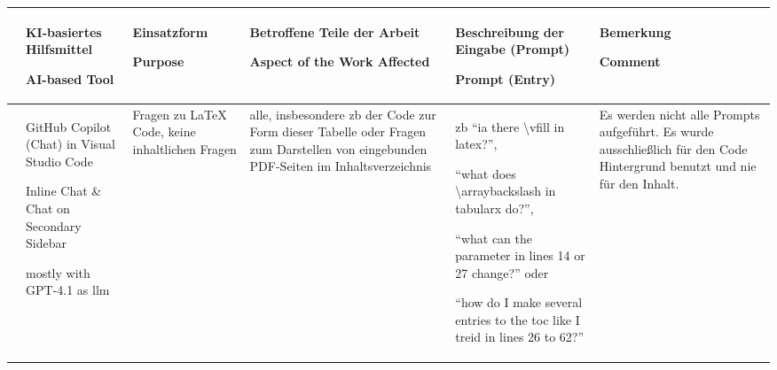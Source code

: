         \begin{landscape}
    \begin{table}
\centering 
\begin{tabularx}{\linewidth}{| >{\raggedright\arraybackslash} c || >{\raggedright\arraybackslash} X | >{\raggedright\arraybackslash} X | >{\raggedright\arraybackslash} X | >{\raggedright\arraybackslash} X | >{\raggedright\arraybackslash} X |} %

    \hline
                                & 
    KI-basiertes Hilfsmittel 
        
    AI-based Tool               & 
    Einsatzform 

    Purpose                     & 
    Betroffene Teile der Arbeit 
        
    Aspect of the Work Affected & 
    Beschreibung der Eingabe (Prompt) 
  
    Prompt (Entry)              & 
    Bemerkung 
    
    Comment                     \\ 
    \hline
    \hline

    
    1                                                                                                                                           & 
    GitHub Copilot (Chat) in Visual Studio Code

    Inline Chat \& Chat on Secondary Sidebar

    mostly with GPT-4.1 as \gls{llm}                                                                                                            & 
    Fragen zu \LaTeX{} Code, keine inhaltlichen Fragen                                                                                          &
    alle, insbesondere \gls{zb} der Code zur Form dieser Tabelle oder Fragen zum Darstellen von eingebunden PDF-Seiten im Inhaltsverzeichnis    & 
    \gls{zb} \enquote{ia there \textbackslash{}vfill in latex?},  
    
    \enquote{what does \textbackslash{}arraybackslash in tabularx do?}, 
    
    \enquote{what can the parameter in lines 14 or 27 change?} oder
    
    \enquote{how do I make several entries to the toc like I treid in lines 26 to 62?}                                                          & 
    Es werden nicht alle Prompts aufgeführt. Es wurde ausschließlich für den Code Hintergrund benutzt und nie für den Inhalt. 
    

\end{tabularx}
\end{table}
\end{landscape}
